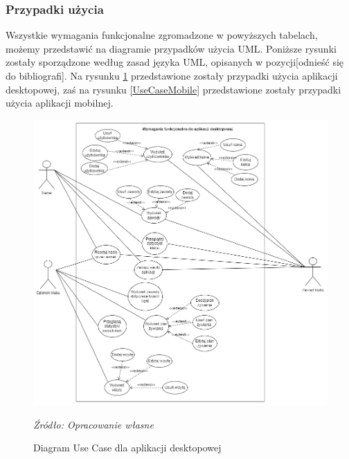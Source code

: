 \documentclass[12pt,oneside]{report}
\begin{document}
\subsubsection{Przypadki użycia}
Wszystkie wymagania funkcjonalne zgromadzone w powyższych tabelach, możemy przedstawić na diagramie przypadków użycia UML. Poniższe rysunki zostały sporządzone według zasad języka UML, opisanych w pozycji[odnieść się do bibliografi]. Na rysunku \ref{UseCaseDesktop} przedstawione zostały przypadki użycia aplikacji desktopowej, zaś na rysunku \ref{UseCaseMobile} przedstawione zostały przypadki użycia aplikacji mobilnej.
\begin{figure}[H]
	\centering
	\includegraphics[scale=0.5]{UseCaseDesktop}
	\caption{Diagram Use Case dla aplikacji desktopowej}
	\textit{Źródło: Opracowanie własne}
	\label{UseCaseDesktop}
\end{figure}
\end{document}
